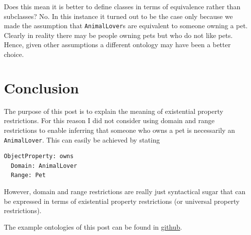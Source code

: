 \documentclass{amsart}
\begin{document}
Does this mean it is better to define classes in terms of equivalence rather than subclasses? No. In this instance it turned out to be the case only because we made the assumption that \texttt{AnimalLover}s are equivalent to someone owning a pet. Clearly in reality there may be people owning pets but who do not like pets. Hence, given other assumptions a different ontology may have been a better choice.

  \section{Conclusion}
The purpose of this post is to explain the meaning of existential property restrictions. For this reason I did not consider using domain and range restrictions to enable inferring that someone who owns a pet is necessarily an \texttt{AnimalLover}. This can easily be achieved by stating 
\begin{small}
\begin{verbatim} 
ObjectProperty: owns
  Domain: AnimalLover
  Range: Pet
\end{verbatim}
\end{small}  
However, domain and range restrictions are really just syntactical sugar that can be expressed in terms of existential property restrictions (or universal property restrictions).  
 
The example ontologies of this post can be found in \href{https://github.com/henrietteharmse/henrietteharmse/tree/master/blog/tutorial/ontologies/docs/Understanding\%20OWL\%20Existential\%20Property\%20Restrictions}{github}.

  
  
 
\end{document}
